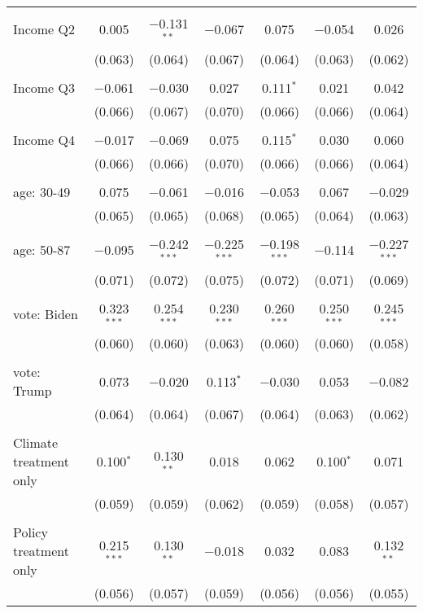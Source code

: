 \begin{tabular}{@{\extracolsep{5pt}}lcccccc}
  & & & & & & \\ 
 Income Q2 & 0.005 & $-$0.131$^{**}$ & $-$0.067 & 0.075 & $-$0.054 & 0.026 \\ 
  & (0.063) & (0.064) & (0.067) & (0.064) & (0.063) & (0.062) \\ 
  & & & & & & \\ 
 Income Q3 & $-$0.061 & $-$0.030 & 0.027 & 0.111$^{*}$ & 0.021 & 0.042 \\ 
  & (0.066) & (0.067) & (0.070) & (0.066) & (0.066) & (0.064) \\ 
  & & & & & & \\ 
 Income Q4 & $-$0.017 & $-$0.069 & 0.075 & 0.115$^{*}$ & 0.030 & 0.060 \\ 
  & (0.066) & (0.066) & (0.070) & (0.066) & (0.066) & (0.064) \\ 
  & & & & & & \\ 
 age: 30-49 & 0.075 & $-$0.061 & $-$0.016 & $-$0.053 & 0.067 & $-$0.029 \\ 
  & (0.065) & (0.065) & (0.068) & (0.065) & (0.064) & (0.063) \\ 
  & & & & & & \\ 
 age: 50-87 & $-$0.095 & $-$0.242$^{***}$ & $-$0.225$^{***}$ & $-$0.198$^{***}$ & $-$0.114 & $-$0.227$^{***}$ \\ 
  & (0.071) & (0.072) & (0.075) & (0.072) & (0.071) & (0.069) \\ 
  & & & & & & \\ 
 vote: Biden & 0.323$^{***}$ & 0.254$^{***}$ & 0.230$^{***}$ & 0.260$^{***}$ & 0.250$^{***}$ & 0.245$^{***}$ \\ 
  & (0.060) & (0.060) & (0.063) & (0.060) & (0.060) & (0.058) \\ 
  & & & & & & \\ 
 vote: Trump & 0.073 & $-$0.020 & 0.113$^{*}$ & $-$0.030 & 0.053 & $-$0.082 \\ 
  & (0.064) & (0.064) & (0.067) & (0.064) & (0.063) & (0.062) \\ 
  & & & & & & \\ 
 Climate treatment only & 0.100$^{*}$ & 0.130$^{**}$ & 0.018 & 0.062 & 0.100$^{*}$ & 0.071 \\ 
  & (0.059) & (0.059) & (0.062) & (0.059) & (0.058) & (0.057) \\ 
  & & & & & & \\ 
 Policy treatment only & 0.215$^{***}$ & 0.130$^{**}$ & $-$0.018 & 0.032 & 0.083 & 0.132$^{**}$ \\ 
  & (0.056) & (0.057) & (0.059) & (0.056) & (0.056) & (0.055) \\ 

\end{tabular}
